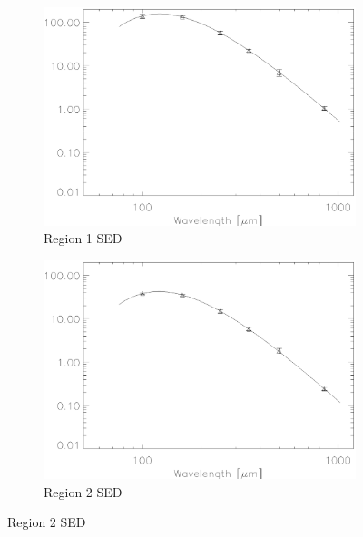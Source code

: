 \begin{figure}
  \centering
  \begin{subfigure}[t]{.48\textwidth}
    \centering
    \includegraphics[width=1.\linewidth]{sed_imgs/region_1beta_22_SED_fit.eps}
    \caption{Region 1 SED}
  \end{subfigure}
  \quad
  \begin{subfigure}[t]{.48\textwidth}
    \centering
    \includegraphics[width=1.\linewidth]{sed_imgs/region_2beta_23_SED_fit.eps}
    \caption{Region 2 SED}
  \end{subfigure}
  

\end{figure}
